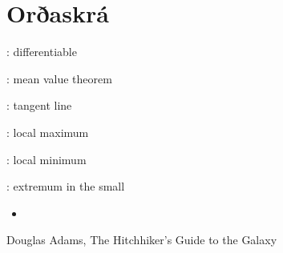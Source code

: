\documentclass[a4paper,10pt,icelandic]{sphinxmanual}
\begin{document}
\chapter{Orðaskrá}
\label{\detokenize{ordaskra:oraskra}}\label{\detokenize{ordaskra::doc}}
 : differentiable


 : mean value theorem


 : tangent line

 : local maximum

 : local minimum

 : extremum in the small
\begin{itemize}
\item {} 

\end{itemize}


\textendash{} Douglas Adams, The Hitchhiker’s Guide to the Galaxy



\renewcommand{\indexname}{Atriðaskrá}
\printindex
\end{document}
